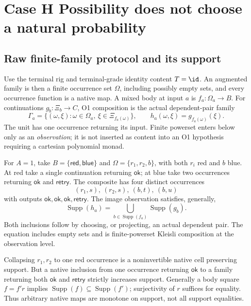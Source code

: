 \section{Case H Possibility does not choose a natural probability}\label{sec:caseH}

\subsection{Raw finite-family protocol and its support}
Use the terminal rig and terminal-grade identity content $T=\id$.
An augmented family is then a finite occurrence set $\Omega$, including
possibly empty sets, and every occurrence function is a native map.
A mixed body at input $a$ is $f_a:\Omega_a\to B$. For continuations
$g_b:\Xi_b\to C$, O1 composition is the actual dependent-pair family
\[
\Gamma_a=\{(\omega,\xi):\omega\in\Omega_a,
\ \xi\in\Xi_{f_a(\omega)}\},\qquad
h_a(\omega,\xi)=g_{f_a(\omega)}(\xi).
\]
The unit has one occurrence returning its input. Finite powerset enters
below only as an \emph{observation}; it is not inserted as content into
an O1 hypothesis requiring a cartesian polynomial monad.

For $A=1$, take $B=\{\mathsf{red},\mathsf{blue}\}$ and
$\Omega=\{r_1,r_2,b\}$, with both $r_i$ red and $b$ blue.
At red take a single continuation returning $\mathsf{ok}$; at blue
take two occurrences returning $\mathsf{ok}$ and $\mathsf{retry}$.
The composite has four distinct occurrences
\[
(r_1,s),\ (r_2,s),\ (b,t),\ (b,u)
\]
with outputs $\mathsf{ok},\mathsf{ok},\mathsf{ok},\mathsf{retry}$.
The image observation satisfies, generally,
\begin{equation}\label{eq:H-support}
\operatorname{Supp}(h_a)=
\bigcup_{b\in\operatorname{Supp}(f_a)}\operatorname{Supp}(g_b).
\end{equation}
Both inclusions follow by choosing, or projecting, an actual dependent
pair. The equation includes empty sets and is finite-powerset Kleisli
composition at the observation level.

Collapsing $r_1,r_2$ to one red occurrence is a noninvertible native
cell preserving support. But a native inclusion from one occurrence
returning $\mathsf{ok}$ to a family returning both $\mathsf{ok}$ and
$\mathsf{retry}$ strictly increases support. Generally a body square
$f=f'r$ implies $\operatorname{Supp}(f)\subseteq\operatorname{Supp}(f')$;
surjectivity of $r$ suffices for equality. Thus arbitrary native maps
are monotone on support, not all support equalities.

